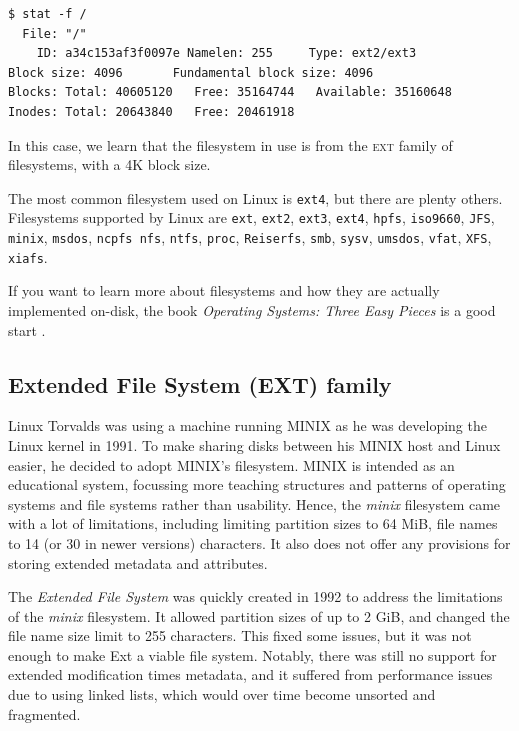 \documentclass[a4paper]{article}
\begin{document}
\begin{verbatim}
$ stat -f /
  File: "/"
    ID: a34c153af3f0097e Namelen: 255     Type: ext2/ext3
Block size: 4096       Fundamental block size: 4096
Blocks: Total: 40605120   Free: 35164744   Available: 35160648
Inodes: Total: 20643840   Free: 20461918
\end{verbatim}

In this case, we learn that the filesystem in use is from the \textsc{ext} family of filesystems, with a 4K block size.

The most common filesystem used on Linux is \verb|ext4|, but there are plenty others. Filesystems supported by Linux are \verb|ext|, \verb|ext2|, \verb|ext3|, \verb|ext4|, \verb|hpfs|, \verb|iso9660|, \verb|JFS|, \verb|minix|, \verb|msdos|, \verb|ncpfs nfs|, \verb|ntfs|, \verb|proc|, \verb|Reiserfs|, \verb|smb|, \verb|sysv|, \verb|umsdos|, \verb|vfat|, \verb|XFS|, \verb|xiafs|.

If you want to learn more about filesystems and how they are actually implemented on-disk, the book \emph{Operating Systems: Three Easy Pieces} is a good start \cite{ostep}.

\subsection{Extended File System (EXT) family}


Linux Torvalds was using a machine running MINIX as he was developing the Linux kernel in 1991. To make sharing disks between his MINIX host and Linux easier, he decided to adopt MINIX's filesystem. MINIX is intended as an educational system, focussing more teaching structures and patterns of operating systems and file systems rather than usability. Hence, the \emph{minix} filesystem came with a lot of limitations, including limiting partition sizes to 64 MiB, file names to 14 (or 30 in newer versions) characters. It also does not offer any provisions for storing extended metadata and attributes.


The \emph{Extended File System} was quickly created in 1992 to address the limitations of the \emph{minix} filesystem. It allowed partition sizes of up to 2 GiB, and changed the file name size limit to 255 characters. This fixed some issues, but it was not enough to make Ext a viable file system. Notably, there was still no support for extended modification times metadata, and it suffered from performance issues due to using linked lists, which would over time become unsorted and fragmented\cite{ext2-doc}. 
\end{document}
